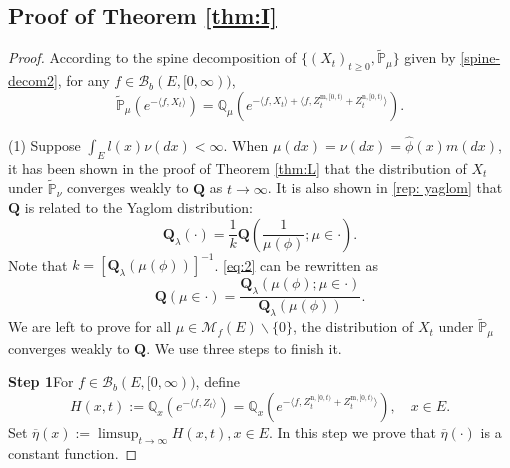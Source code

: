 \documentclass[12pt,a4paper]{amsart}
\numberwithin{equation}{section}
\theoremstyle{plain}
\theoremstyle{definition}
\theoremstyle{remark}
\begin{document}
\subsection{Proof of Theorem \ref{thm:I}}
\begin{proof}
According to the spine decomposition of $\{(X_t)_{t\geq 0}, \widetilde{\mathbb P}_\mu\}$  given by
\eqref{spine-decom2}, for any
$f\in\mathcal B_b(E,[0,\infty))$,
\[
\widetilde {\mathbb P}_{\mu}\left(e^{-\langle f, X_t\rangle }\right)=\mathbb Q_{\mu}\left(e^{-\langle f, X_t\rangle+\langle f, Z^{{\mathrm m},[0,t)}_t+Z^{{\mathrm n},[0,t)}_t\rangle }\right).
\]

(1) Suppose $\int_El(x)\nu(dx)<\infty$.
When $\mu(dx)=\nu(dx)=\hat\phi(x)m(dx)$, it has been shown in the proof of Theorem \ref{thm:L} that the distribution of
$X_t$ under $\widetilde {\mathbb P}_{\nu}$ converges weakly to $\mathbf Q$ as $t\to\infty$.
It is also shown in \eqref{rep: yaglom} that $\mathbf Q$ is related to the Yaglom distribution:
\begin{equation}\label{eq:2}
\mathbf Q_\lambda(\cdot)=\dfrac{1}{k}{\mathbf Q}\left(\dfrac{1}{\mu(\phi) }; \mu\in\cdot\right).
\end{equation}
Note that $k=[\mathbf Q_\lambda(\mu(\phi))]^{-1}$. \eqref{eq:2} can be rewritten as
\begin{equation}\label{eq size bias}
{\mathbf Q}\left(\mu\in\cdot\right)=\dfrac{\mathbf Q_\lambda(\mu(\phi); \mu\in \cdot)}{\mathbf Q_\lambda(\mu(\phi))}.
\end{equation}
We are left to prove for all $\mu\in\mathcal M_f(E)\backslash\{0\}$, the distribution of $X_t$ under $\widetilde {\mathbb P}_{\mu}$ converges weakly to $\mathbf Q$.  We use three steps to finish it.

{\bf Step 1}\quad For $f\in\mathcal B_b(E,[0,\infty))$, define
\begin{equation}\label{def: H}
H(x,t):={\mathbb Q}_x\left(e^{-\langle f, Z_{t}\rangle }\right)={\mathbb Q}_x\left(e^{-\langle f, Z^{\mathrm n, [0,t)}_{t} + Z^{\mathrm m, [0,t)}_{t}\rangle }\right),\quad x\in E.
\end{equation}
Set $\overline \eta(x):=\limsup_{t\to\infty}H(x,t), x\in E$.
In this step we prove that $\overline \eta(\cdot)$ is a constant function.


\end{proof}
\end{document}
